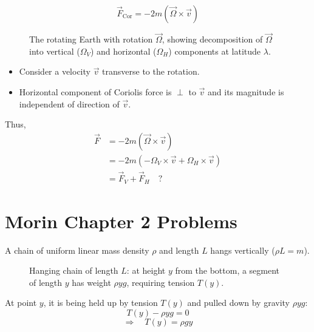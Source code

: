 \begin{example}

\[
  \vec{F}_\text{Cor} = -2m(\vec{\Omega}\times\vec{v})
\]

\begin{figure}[H]
  \centering
  \caption{The rotating Earth with rotation $\vec{\Omega}$, showing decomposition of $\vec{\Omega}$ into vertical ($\Omega_V$) and horizontal ($\Omega_H$) components at latitude $\lambda$.}
\end{figure}

\begin{itemize}
  \item Consider a velocity $\vec{v}$ transverse to the rotation.
  \item Horizontal component of Coriolis force is $\perp$ to $\vec{v}$ and its magnitude is independent of direction of $\vec{v}$.
\end{itemize}

Thus,
\begin{align*}
  \vec{F} &= -2m(\vec{\Omega}\times\vec{v}) \\
  &= -2m(-\Omega_V\times\vec{v} + \Omega_H\times\vec{v}) \\
  &= \vec{F}_V + \vec{F}_H \quad ?
\end{align*}
\end{example}

\chapter{Morin Chapter 2 Problems}

\begin{example}
A chain of uniform linear mass density $\rho$ and length $L$ hangs vertically ($\rho L = m$).

\begin{figure}[H]
  \centering
  \caption{Hanging chain of length $L$: at height $y$ from the bottom, a segment of length $y$ has weight $\rho y g$, requiring tension $T(y)$.}
\end{figure}

At point $y$, it is being held up by tension $T(y)$ and pulled down by gravity $\rho y g$:
\[
  T(y) - \rho y g = 0
\]
\[
  \Rightarrow \quad \boxed{T(y) = \rho g y}
\]
\end{example}

